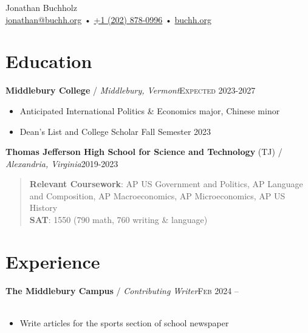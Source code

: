\documentclass[12pt, a4paper]{article}
\begin{document}
{\LARGE Jonathan Buchholz}\\
\href{mailto:jonathan@buchh.org}{jonathan@buchh.org} • \href{tel:2028780996}{+1 (202) 878-0996} • \href{https://buchh.org}{buchh.org}\\

\vspace{-8mm}
\section*{Education}
\textbf{Middlebury College} / \textit{Middlebury, Vermont}\hfill\textsc{Expected 2023-2027}\\
\begin{itemize}
    \vspace{-8mm}
    \item Anticipated International Politics \& Economics major, Chinese minor
    \item Dean's List and College Scholar Fall Semester 2023
\end{itemize}
\textbf{Thomas Jefferson High School for Science and Technology} (TJ) / \textit{Alexandria, Virginia}\hfill\textsc{2019-2023}\\
\vspace{-4mm}
\begin{quote}
\vspace{-2mm}
\textbf{Relevant Coursework}: AP US Government and Politics, AP Language and Composition, AP Macroeconomics, AP Microeconomics, AP US History\\
\vspace{-4mm}
\textbf{SAT}: 1550 (790 math, 760 writing \& language)\\
\end{quote}

\vspace{-8mm}
\section*{Experience}

\textbf{The Middlebury Campus} / \textit{Contributing Writer}\hfill\textsc{Feb 2024 --}\\\
\begin{itemize}
    \vspace{-8mm}
    \item Write articles for the sports section of school newspaper
\end{itemize}
\end{document}
